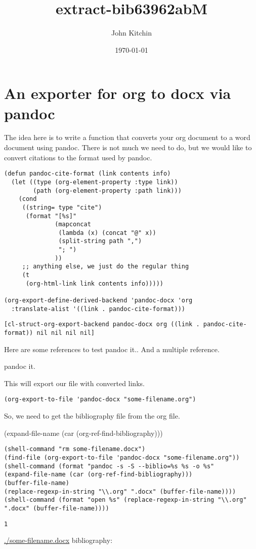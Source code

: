 \documentclass[11pt]{article}
\author{John Kitchin}
\date{\today}
\title{extract-bib63962abM}
\begin{document}
\tableofcontents

\section{An exporter for org to docx via pandoc}
\label{sec-1}

The idea here is to write a function that converts your org document to a word document using pandoc. There is not much we need to do, but we would like to convert citations to the format used by pandoc.

\begin{verbatim}
(defun pandoc-cite-format (link contents info)
  (let ((type (org-element-property :type link))
        (path (org-element-property :path link)))
    (cond
     ((string= type "cite")
      (format "[%s]"
              (mapconcat
               (lambda (x) (concat "@" x))
               (split-string path ",")
               "; ")
              ))
     ;; anything else, we just do the regular thing
     (t
      (org-html-link link contents info)))))

(org-export-define-derived-backend 'pandoc-docx 'org
  :translate-alist '((link . pandoc-cite-format)))
\end{verbatim}

\begin{verbatim}
[cl-struct-org-export-backend pandoc-docx org ((link . pandoc-cite-format)) nil nil nil nil]
\end{verbatim}

Here are some references to test pandoc it.. And a multiple reference.

pandoc it.

This will export our file with converted links.
\begin{verbatim}
(org-export-to-file 'pandoc-docx "some-filename.org")
\end{verbatim}

So, we need to get the bibliography file from the org file.

(expand-file-name (car (org-ref-find-bibliography)))

\begin{verbatim}
(shell-command "rm some-filename.docx")
(find-file (org-export-to-file 'pandoc-docx "some-filename.org"))
(shell-command (format "pandoc -s -S --biblio=%s %s -o %s"
(expand-file-name (car (org-ref-find-bibliography)))
(buffer-file-name)
(replace-regexp-in-string "\\.org" ".docx" (buffer-file-name))))
(shell-command (format "open %s" (replace-regexp-in-string "\\.org" ".docx" (buffer-file-name))))
\end{verbatim}

\begin{verbatim}
1
\end{verbatim}

\url{./some-filename.docx}
bibliography:
\end{document}
